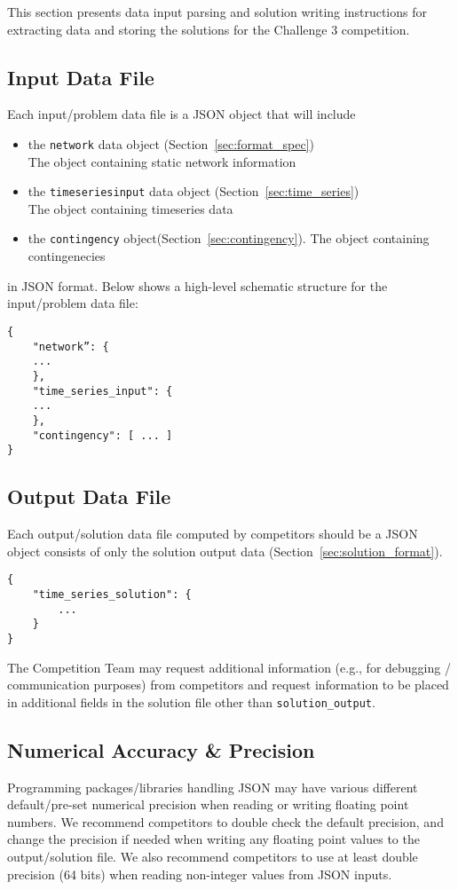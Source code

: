 This section presents data input parsing and solution writing instructions for
extracting data and storing the solutions 
for the Challenge 3 competition.

\subsection{Input Data File}
Each input/problem data file is a JSON object that will include
\begin{itemize}
    \item the \texttt{network} data object (Section~\ref{sec:format_spec})\\
        The object containing static network information
    \item the \texttt{timeseriesinput} data object (Section~\ref{sec:time_series})\\
        The object containing timeseries data
    \item the \texttt{contingency} object(Section~\ref{sec:contingency}).
        The object containing contingenecies
\end{itemize}
in JSON format. Below shows a high-level schematic structure for the input/problem data file:
\begin{verbatim}
{
    "network”: {
    ...
    },
    "time_series_input": {
    ...
    },
    "contingency": [ ... ]
}
\end{verbatim}

\subsection{Output Data File}
Each output/solution data file computed by competitors should be a JSON object consists of only 
the solution output data (Section~\ref{sec:solution_format}).
\begin{verbatim}
{
    "time_series_solution": {
        ...
    }    
}
\end{verbatim}
The Competition Team may request additional information (e.g., for debugging / communication purposes)
from competitors and request information to be placed in 
additional fields in the solution file other than \texttt{solution\_output}. 

\subsection{Numerical Accuracy \& Precision}
Programming packages/libraries handling JSON may have various different 
default/pre-set numerical precision when reading or writing floating point numbers.
We recommend competitors to 
double check the default precision,
and change the precision if needed
when writing any floating point values to the output/solution file.
We also recommend competitors to use at least double precision (64 bits) 
when reading non-integer values from JSON inputs. 

